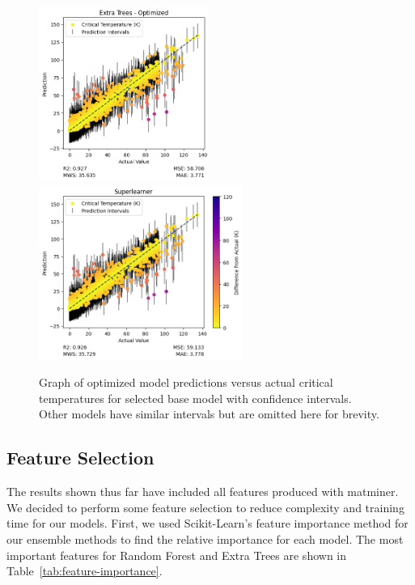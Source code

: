 \documentclass[twocolumn, nofootinbib, secnumarabic, amssymb, nobibnotes, aps, prd]{revtex4-2}
\begin{document}
\begin{figure}[!h]
    \includegraphics[height=2.25in]{images/subfigures/uncertainty/extra_trees_optimized.png}
    \includegraphics[height=2.25in]{images/subfigures/uncertainty/superlearner.png}
    \caption{Graph of optimized model predictions versus actual critical temperatures for selected base model with confidence intervals. Other models have similar intervals but are omitted here for brevity.}
    \label{fig:results-uncertainty}
\end{figure}%

\clearpage

\subsection{Feature Selection} %


The results shown thus far have included all features produced with matminer. We decided to perform some feature selection to reduce complexity and training time for our models. First, we used Scikit-Learn's feature importance method for our ensemble methods to find the relative importance for each model. The most important features for Random Forest and Extra Trees are shown in Table~\ref{tab:feature-importance}. 
\end{document}
